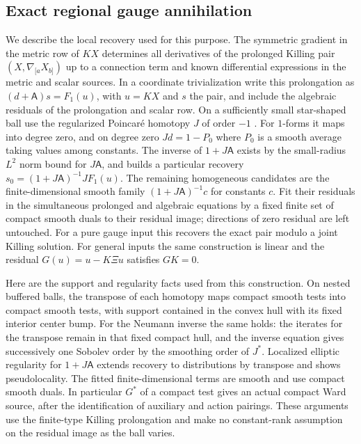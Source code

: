 \documentclass[11pt]{article}
\begin{document}
\subsection{Exact regional gauge annihilation}\label{sec:localgauge}
We describe the local recovery used for this purpose. The symmetric
gradient in the metric row of $KX$ determines all derivatives of the prolonged
Killing pair $(X,\nabla_{[a}X_{b]})$ up to a connection term and
known differential expressions in the metric and scalar sources.
In a coordinate trivialization write this prolongation as
$(d+\mathsf A)s=F_1(u)$, with $u=KX$ and $s$ the pair, and
include the algebraic residuals of the prolongation and scalar row.
On a sufficiently small star-shaped ball use the regularized
Poincar\'e homotopy $J$ of order $-1$ \cite{costabel}. For $1$-forms
it maps into degree zero, and on degree zero $Jd=1-P_0$ where
$P_0$ is a smooth average taking values among constants. The inverse
of $1+J\mathsf A$ exists by the small-radius $L^2$ norm bound for
$J\mathsf A$, and builds a particular recovery
$s_0=(1+J\mathsf A)^{-1}JF_1(u)$. The remaining homogeneous
candidates are the finite-dimensional smooth family
$(1+J\mathsf A)^{-1}c$ for constants $c$. Fit their residuals in
the simultaneous prolonged and algebraic equations by a fixed
finite set of compact smooth duals to their residual image; directions
of zero residual are left untouched. For a pure gauge input this
recovers the exact pair modulo a joint Killing solution. For general
inputs the same construction is linear and the residual
$G(u)=u-K\Xi u$ satisfies $GK=0$.

Here are the support and regularity facts used from this construction.
On nested buffered balls, the transpose of each homotopy maps
compact smooth tests into compact smooth tests, with support
contained in the convex hull with its fixed interior center bump.
For the Neumann inverse the same holds: the iterates for the transpose
remain in that fixed compact hull, and the inverse equation gives
successively one Sobolev order by the smoothing order of $J^*$.
Localized elliptic regularity for $1+J\mathsf A$ extends recovery to
distributions by transpose and shows pseudolocality. The fitted
finite-dimensional terms are smooth and use compact smooth duals.
In particular $G^*$ of a compact test gives an actual compact Ward
source, after the identification of auxiliary and action pairings.
These arguments use the finite-type Killing prolongation and make no
constant-rank assumption on the residual image as the ball varies.
\end{document}
